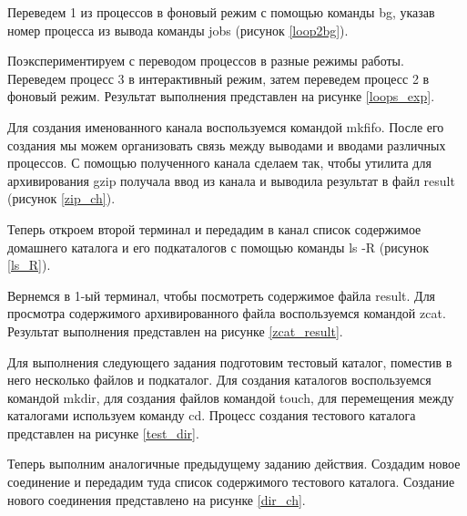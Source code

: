 Переведем 1 из процессов в фоновый режим с помощью команды bg, указав номер процесса из вывода команды jobs (рисунок \ref{loop2bg}).


Поэкспериментируем с переводом процессов в разные режимы работы. Переведем процесс 3 в интерактивный режим, затем переведем процесс 2 в фоновый режим. Результат выполнения представлен на рисунке \ref{loops_exp}.


Для создания именованного канала воспользуемся командой mkfifo. После его создания мы можем организовать связь между выводами и вводами различных процессов. С помощью полученного канала сделаем так, чтобы утилита для архивирования gzip получала ввод из канала и выводила результат в файл result (рисунок \ref{zip_ch}).


Теперь откроем второй терминал и передадим в канал список содержимое домашнего каталога и его подкаталогов с помощью команды ls -R (рисунок \ref{ls_R}).


Вернемся в 1-ый терминал, чтобы посмотреть содержимое файла result. Для просмотра содержимого архивированного файла воспользуемся командой zcat. Результат выполнения представлен на рисунке \ref{zcat_result}.


Для выполнения следующего задания подготовим тестовый каталог, поместив в него несколько файлов и подкаталог. Для создания каталогов воспользуемся командой mkdir, для создания файлов командой touch, для перемещения между каталогами используем команду cd. Процесс создания тестового каталога представлен на рисунке \ref{test_dir}.


Теперь выполним аналогичные предыдущему заданию действия. Создадим новое соединение и передадим туда список содержимого тестового каталога. Создание нового соединения представлено на рисунке \ref{dir_ch}.


